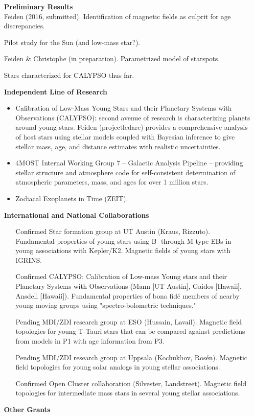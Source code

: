 \documentclass[12pt,a4paper]{article}
\begin{document}
{\bf \large Preliminary Results} \\
Feiden (2016, submitted). Identification of magnetic fields as culprit for age discrepancies.

Pilot study for the Sun (and low-mass star?).

Feiden \& Christophe (in preparation). Parametrized model of starspots.

Stars characterized for CALYPSO thus far.

{\bf \large Independent Line of Research}
\begin{itemize}
	\item Calibration of Low-Mass Young Stars and their Planetary Systems with Observations (CALYPSO): 
	second avenue of research is characterizing planets around young stars. 
    Feiden (projectledare) provides a comprehensive analysis of host stars using stellar models coupled 
    with Bayesian inference
    to give stellar mass, age, and distance estimates with realistic uncertainties.
	\item 4MOST Internal Working Group 7 -- Galactic Analysis Pipeline -- providing stellar
    structure and atmosphere code for self-consistent determination of atmospheric 
    parameters, mass, and ages for over 1 million stars.
    \item Zodiacal Exoplanets in Time (ZEIT).
\end{itemize}

{\bf \large International and National Collaborations}
\begin{itemize}
  	\item [Confirmed] Star formation group at UT Austin (Kraus, Rizzuto). Fundamental properties of young stars using B- through M-type EBs in young associations with Kepler/K2. Magnetic fields of young stars with IGRINS.
  	\item [Confirmed] CALYPSO: Calibration of Low-mass Young stars and their Planetary Systems with Observations (Mann [UT Austin], Gaidos [Hawaii], Ansdell [Hawaii]). Fundamental properties of bona fid\'{e} members of nearby young moving groups using "spectro-bolometric techniques."
  	\item [Pending] MDI/ZDI research group at ESO (Hussain, Lavail). Magnetic field topologies for young T-Tauri stars that can be compared against predictions from models in P1 with age information from P3.
  	\item [Pending] MDI/ZDI research group at Uppsala (Kochukhov, Ros\'{e}n). Magnetic field topologies for young solar analogs in young stellar associations.
  	\item [Confirmed] Open Cluster collaboration (Silvester, Landstreet). Magnetic field topologies for intermediate mass stars in several young stellar associations.
\end{itemize}


{\bf \large Other Grants}

\setlength{\itemsep}{0.5mm}
\small

\end{document}
